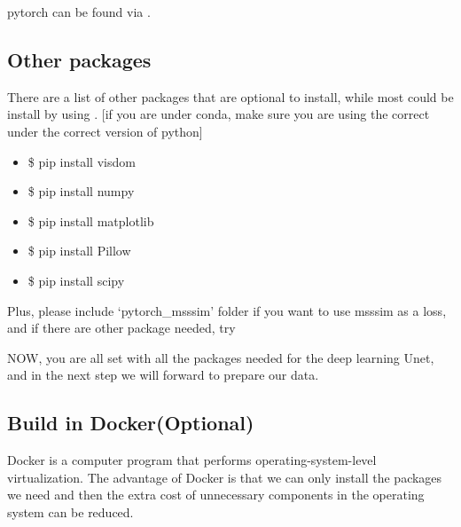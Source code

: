 \documentclass[letterpaper,10pt,english]{sphinxmanual}
\begin{document}
pytorch can be found via .


\subsection{Other packages}
\label{\detokenize{usage/installation:other-packages}}
There are a list of other packages that are optional to install, while most could be install by using . {[}if you are under conda, make sure you are using the correct  under the correct version of python{]}
\begin{itemize}
\item {} 
\$ pip install visdom

\item {} 
\$ pip install numpy

\item {} 
\$ pip install matplotlib

\item {} 
\$ pip install Pillow

\item {} 
\$ pip install scipy

\end{itemize}

Plus, please include ‘pytorch\_msssim’ folder if you want to use msssim as a loss, and if there are other package needed, try 

%
\begin{sphinxVerbatim}[commandchars=\\\{\}]
\end{sphinxVerbatim}

NOW, you are all set with all the packages needed for the deep learning Unet, and in the next step we will forward to prepare our data.


\subsection{Build in Docker(Optional)}
\label{\detokenize{usage/installation:build-in-docker-optional}}
Docker is a computer program that performs operating-system-level virtualization. The advantage of Docker is that we can only install the packages we need and then the extra cost of unnecessary components in the operating system can be reduced.


\end{document}
